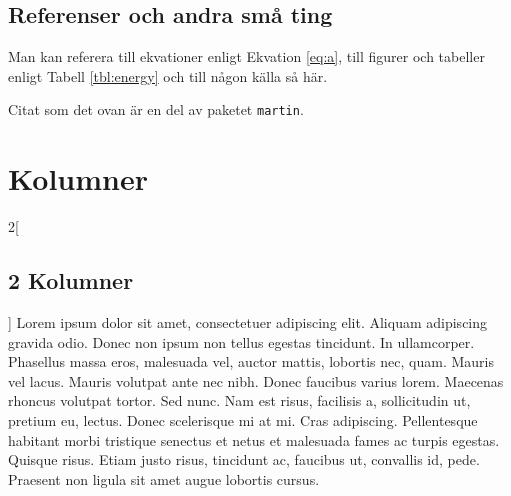 \subsection{Referenser och andra små ting}
\label{subsec:ref}

Man kan referera till ekvationer enligt Ekvation \eqref{eq:a}, till figurer och tabeller enligt Tabell \ref{tbl:energy} och till någon källa så här\cite{lshort}.


Citat som det ovan är en del av paketet \texttt{martin}.

\section{Kolumner}
\begin{multicols}{2}[\subsection{2 Kolumner}]
Lorem ipsum dolor sit amet, consectetuer adipiscing elit. Aliquam adipiscing gravida odio. Donec non ipsum non tellus egestas tincidunt. In ullamcorper. Phasellus massa eros, malesuada vel,  auctor mattis, lobortis nec, quam. Mauris vel lacus. Mauris volutpat ante nec nibh. Donec faucibus varius lorem. Maecenas rhoncus volutpat tortor. Sed nunc. Nam est risus, facilisis a, sollicitudin ut, pretium eu, lectus. Donec scelerisque mi at mi. Cras adipiscing. Pellentesque habitant morbi tristique senectus et netus et malesuada fames ac turpis egestas. Quisque risus. Etiam justo risus, tincidunt ac, faucibus ut, convallis id, pede. Praesent non ligula sit amet augue lobortis cursus.
\end{multicols}

%
